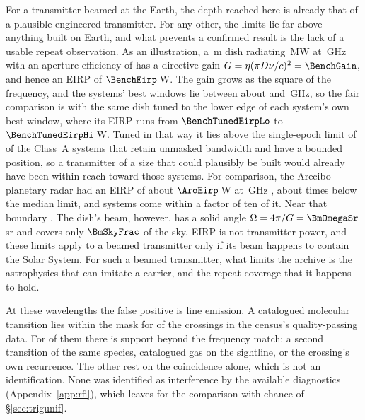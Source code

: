 For a transmitter beamed at the Earth, the depth reached here is already
that of a plausible engineered transmitter. For any other, the limits lie
far above anything built on Earth, and what prevents a confirmed result is
the lack of a usable repeat observation. As an illustration, a \BenchDiam\,m dish
radiating \BenchPowerMW\,MW at \BenchFreqGHz\,GHz with an aperture efficiency
of \BenchEta{} has a directive gain $G=\eta(\pi D\nu/c)^{2}=\BenchGain$, and
hence an EIRP of $\BenchEirp$\,W. The gain grows as the square of the
frequency, and the systems' best windows lie between about \NtBestNuLo{} and
\NtBestNuHi\,GHz, so the fair comparison is with the same dish tuned to
the lower edge of each system's own best window, where its EIRP runs from
$\BenchTunedEirpLo$ to $\BenchTunedEirpHi$\,W. Tuned in that way it lies
above the single-epoch limit of \BenchNSysTuned{} of the \NSysALimSum{}
Class~A systems that retain unmasked bandwidth and have a bounded position,
so a transmitter of a size that could plausibly be built would already have
been within reach toward those systems. For comparison, the Arecibo planetary radar had an EIRP
of about $\AroEirp$\,W at \AroFreqGHz\,GHz \citep{EarthDetectingEarth2025},
about \AroMedMult{} times below the median limit, and \AroNSysTen{}
systems come within a factor of ten of it. Near that boundary
\AroTenEdgeClause. The dish's beam, however, has a solid
angle $\Omega=4\pi/G=\BmOmegaSr$\,sr and covers only $\BmSkyFrac$ of the sky.
EIRP is not transmitter power, and these limits apply to a beamed
transmitter only if its beam happens to contain the Solar System. For such
a beamed transmitter, what limits the archive is the astrophysics that can
imitate a carrier, and the repeat coverage that it happens to hold.

At these wavelengths the false positive is line emission. A
catalogued molecular transition lies within the mask for \CsNAttrQp{} of the
\CsNCrossQp{} crossings in the census's quality-passing data. For
\LnAttrSupp{} of them there is support beyond the frequency match: a second
transition of the same species, catalogued gas on the sightline, or the
crossing's own recurrence. The other \LnAttrCoincWord{} rest on the
coincidence alone, which is not an identification. None was identified as
interference by the available diagnostics (Appendix~\ref{app:rfi}), which
leaves \CsNUnattrQp{} for the comparison with chance of \S\ref{sec:trigunif}.

